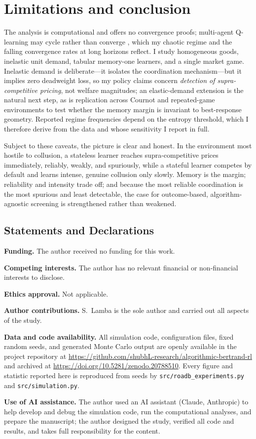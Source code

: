 \documentclass[11pt]{article}
\begin{document}
\section{Limitations and conclusion}\label{sec:conc}
The analysis is computational and offers no convergence proofs; multi-agent Q-learning may cycle rather than
converge \citep{waltmankaymak2008}, which my chaotic regime and the falling convergence rates at long
horizons reflect. I study homogeneous goods, inelastic unit demand, tabular memory-one learners, and a
single market game. Inelastic demand is deliberate---it isolates the coordination mechanism---but it implies
zero deadweight loss, so my policy claims concern \emph{detection of supra-competitive pricing}, not
welfare magnitudes; an elastic-demand extension is the natural next step, as is replication across Cournot
and repeated-game environments to test whether the memory margin is invariant to best-response geometry.
Reported regime frequencies depend on the entropy threshold, which I therefore derive from the data and
whose sensitivity I report in full.

Subject to these caveats, the picture is clear and honest. In the environment most hostile to collusion, a
stateless learner reaches supra-competitive prices immediately, reliably, weakly, and spuriously, while a
stateful learner competes by default and learns intense, genuine collusion only slowly. Memory is the
margin; reliability and intensity trade off; and because the most reliable coordination is the most spurious
and least detectable, the case for outcome-based, algorithm-agnostic screening is strengthened rather than
weakened.

\subsection*{Statements and Declarations}
\textbf{Funding.} The author received no funding for this work.

\textbf{Competing interests.} The author has no relevant financial or non-financial interests to disclose.

\textbf{Ethics approval.} Not applicable.

\textbf{Author contributions.} S.\ Lamba is the sole author and carried out all aspects of the study.

\textbf{Data and code availability.} All simulation code, configuration files, fixed random seeds, and
generated Monte Carlo output are openly available in the project repository at
\url{https://github.com/shubhL-research/algorithmic-bertrand-rl} and archived at
\url{https://doi.org/10.5281/zenodo.20788510}. Every figure and statistic reported here is reproduced from
seeds by \texttt{src/roadb\_experiments.py} and \texttt{src/simulation.py}.

\textbf{Use of AI assistance.} The author used an AI assistant (Claude, Anthropic) to help develop and debug
the simulation code, run the computational analyses, and prepare the manuscript; the author designed the
study, verified all code and results, and takes full responsibility for the content.



\end{document}
